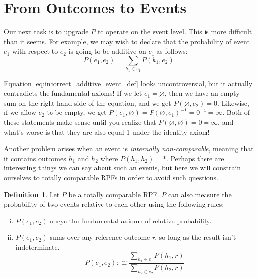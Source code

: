 \documentclass[twoside]{article}
\theoremstyle{plain}%
\theoremstyle{definition}
\newtheorem{definition}{Definition}[section]
\theoremstyle{remark}
\begin{document}
\section{From Outcomes to Events}

Our next task is to upgrade \(P\) to operate on the event level. This is more difficult than it seems. For example, we may wish to declare that the probability of event \(e_1\) with respect to \(e_2\) is going to be additive on \(e_1\) as follows:
\begin{equation}
\label{eq:incorrect_additive_event_def}
P(e_1, e_2) = \sum_{h_1 \in e_1}P(h_1, e_2)
\end{equation}

Equation \ref{eq:incorrect_additive_event_def} looks uncontroversial, but it actually contradicts the fundamental axioms! If we let \(e_1 = \varnothing\), then we have an empty sum on the right hand side of the equation, and we get \(P(\varnothing, e_2) = 0\). Likewise, if we allow \(e_2\) to be empty, we get \(P(e_1, \varnothing) = P(\varnothing, e_1)^{-1}=0^{-1}=\infty\). Both of these statements make sense until you realize that \(P(\varnothing, \varnothing) = 0 = \infty\), and what's worse is that they are also equal 1 under the identity axiom!

Another problem arises when an event is \textit{internally non-comparable}, meaning that it contains outcomes \(h_1\) and \(h_2\) where \(P(h_1, h_2) = \ast\). Perhaps there are interesting things we can say about such an events, but here we will constrain ourselves to totally comparable RPFs in order to avoid such questions.

\begin{definition}
\label{def:event_comparison}
Let \(P\) be a totally comparable RPF. \(P\) can also measure the probability of two events relative to each other using the following rules:

\begin{enumerate}[(i)]
  \item \label{event_def_1} \(P(e_1, e_2)\) obeys the fundamental axioms of relative probability.
  \item \label{event_def_2} \(P(e_1, e_2)\) sums over any reference outcome \(r\), so long as the result isn't indeterminate.
    \begin{equation}
      \label{eq:event_def_ratio_match}
      P(e_1, e_2) :\cong \frac{\sum_{h_1 \in e_1} P(h_1, r)}{\sum_{h_2 \in e_2} P(h_2, r)}
    \end{equation}
\end{enumerate}
\end{definition}
\end{document}
